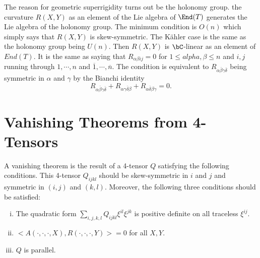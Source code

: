 The reason for geometric superrigidity turns out be the holonomy group. the curvature $R(X, Y)$ as an element of the Lie algebra of $\End(T)$ generates the Lie algebra of the holonomy group. The minimum condition is $O(n)$ which simply says that $R(X, Y)$ is skew-symmetric. The K\"ahler case is the same as the holonomy group being $U(n)$. Then $R(X, Y)$ is $\bC$-linear as an element of $End(T)$. It is the same as saying that $R_{\alpha \beta ij}=0$ for $1 \leq alpha, \beta \leq n$ and $i ,j$ running through $1, \cdots, n$ and $\overline{1}, \cdots, \overline{n}$. The condition is equivalent to $R_{\alpha \overline{\beta}\gamma\overline{\delta}}$ being symmetric in $\alpha$ and $\gamma$ by the Bianchi identity
$$
R_{\alpha  \overline{\beta} \gamma \overline{\delta}} + R_{\alpha \gamma \overline{\delta}\beta} + R_{\alpha \overline{\delta}\beta \gamma} = 0.
$$

\section*{Vahishing Theorems from 4-Tensors}

A vanishing theorem is the result of a 4-tensor $Q$ satisfying the following conditions. This 4-tensor $Q_{ijkl}$ should be skew-symmetric in $i$ and $j$ and symmetric in $(i,j)$ and $(k, l)$. Moreover, the following three conditions should be satisfied:
\begin{enumerate}[(i)]
\item The quadratic form $\sum_{i,j,k,l} Q_{ijkl}\xi^{il} \xi^{jk}$ is positive definite on all traceless $\xi^{ij}$.\label{art16-enum-i}

\item $< A(\cdot,\cdot,\cdot, X), R(\cdot,\cdot,\cdot, Y) > = 0$ for all $X, Y$.\label{art16-enum-ii}

\item $Q$ is parallel.\label{art16-enum-iii}
\end{enumerate}

